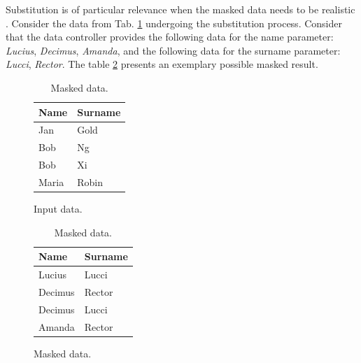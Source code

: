\documentclass[a4paper,twoside,12pt]{book}
\begin{document}
Substitution is of particular relevance when the masked data needs to be realistic \cite{bib:anonymization_planning}.
%
Consider the data from Tab. \ref{id:tab:substitution_raw} undergoing the substitution process.
%
%
Consider that the data controller provides the following data for the name parameter: \textit{Lucius}, \textit{Decimus}, \textit {Amanda}, and the following data for the surname parameter: \textit{Lucci}, \textit{Rector}. The table \ref{id:tab:substitution_masked} presents an exemplary possible masked result.
%
%
%
\begin{table}
\centering
\caption{Substitution.}
\begin{subfigure}{.4\textwidth}
\centering
\caption{Input data.}
\label{id:tab:substitution_raw}
\begin{tabular}{ll}
\toprule
Name   & Surname  \\ \midrule
Jan    & Gold     \\
Bob    & Ng       \\
Bob    & Xi       \\ 
Maria  & Robin    \\ \bottomrule
\end{tabular}
\end{subfigure}
\begin{subfigure}{.4\textwidth}
\centering
\caption{Masked data.}
\label{id:tab:substitution_masked}
\begin{tabular}{ll}
\toprule
Name    & Surname   \\ \midrule
Lucius  & Lucci     \\
Decimus & Rector    \\
Decimus & Lucci     \\ 
Amanda  & Rector    \\ \bottomrule
\end{tabular}
\end{subfigure}
\end{table}
\end{document}
